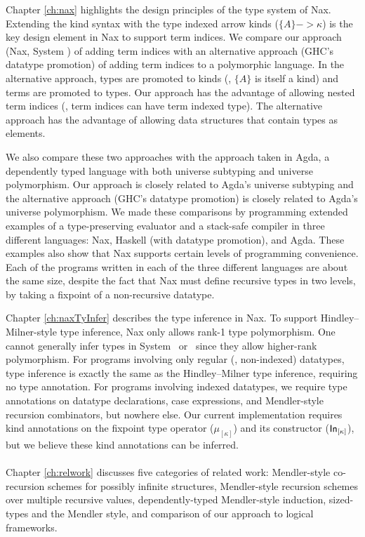 Chapter \ref{ch:nax} highlights the design principles of the type system of Nax.
Extending the kind syntax with the type indexed arrow kinds ($\{A\} -> \kappa$) 
is the key design element in Nax to support term indices.
We compare our approach (Nax, System \Fi) of adding term indices with
an alternative approach (GHC's datatype promotion) of adding
term indices to a polymorphic language. In the alternative approach,
types are promoted to kinds (\ie, $\{A\}$ is itself a kind) and
terms are promoted to types. Our approach has the advantage of
allowing nested term indices (\ie, term indices can have term indexed type).
The alternative approach has the advantage of allowing data structures that
contain types as elements.

We also compare these two approaches with the approach taken in Agda,
a dependently typed language with both universe subtyping and
universe polymorphism. Our approach is closely related to
Agda's universe subtyping and the alternative approach
(GHC's datatype promotion) is closely related to Agda's universe polymorphism.
We made these comparisons by programming extended examples of
a type-preserving evaluator and a stack-safe compiler
in three different languages: Nax, Haskell (with datatype promotion), and Agda.
These examples also show that Nax supports certain levels of
programming convenience. Each of the programs written
in each of the three different languages are about the same size,
despite the fact that Nax must define recursive types in two levels,
by taking a fixpoint of a non-recursive datatype.

Chapter \ref{ch:naxTyInfer} describes the type inference in Nax. To support
Hindley--Milner-style type inference, Nax only allows rank-1 type polymorphism.
One cannot generally infer types in System \Fi\ or \Fixi\ since they allow
higher-rank polymorphism. For programs involving only regular (\ie, non-indexed)
datatypes, type inference is exactly the same as the Hindley--Milner
type inference, requiring no type annotation. For programs involving
indexed datatypes, we require type annotations on datatype declarations,
case expressions, and Mendler-style recursion combinators, but nowhere else.
Our current implementation requires kind annotations on
the fixpoint type operator ($\mu_{[\kappa]}$) and its constructor
($\mathsf{In}_{[\kappa]}$), but we believe these kind annotations can be inferred.

\paragraph{}
Chapter \ref{ch:relwork} discusses five categories of related work:
Mendler-style co-recursion schemes for possibly infinite structures,
Mendler-style recursion schemes over multiple recursive values,
dependently-typed Mendler-style induction, sized-types and the Mendler style,
and comparison of our approach to logical frameworks.

